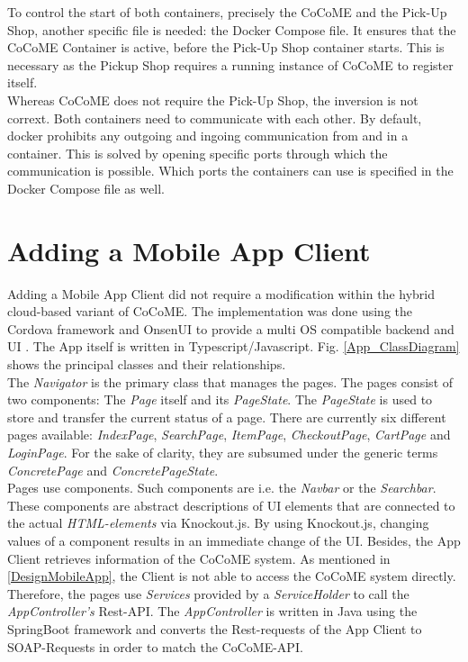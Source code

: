  \noindent
 	To control the start of both containers, precisely the CoCoME and the Pick-Up Shop, another specific file is needed: the Docker Compose file. It ensures that the CoCoME Container is active, before the Pick-Up Shop container starts. This is necessary as the Pickup Shop requires a running instance of CoCoME to register itself.\\
 	Whereas CoCoME does not require the Pick-Up Shop, the inversion is not corrext.
 	Both containers need to communicate with each other. By default, docker prohibits any outgoing and ingoing communication from and in a container. This is solved by opening specific ports through which the communication is possible. Which ports the containers can use is specified in the Docker Compose file as well.
 	
 	
 \section{Adding a Mobile App Client}\label{AppImplementation}
Adding a Mobile App Client did not require a modification within the hybrid cloud-based variant of CoCoME. The implementation was done using the Cordova framework and OnsenUI to provide a multi OS compatible backend and UI \cite{schnabel}. The App itself is written in Typescript/Javascript. Fig. \ref{App_ClassDiagram} shows the principal classes and their relationships.
\\
The \textit{Navigator} is the primary class that manages the pages. The pages consist of two components: The \textit{Page} itself and its \textit{PageState}. The \textit{PageState} is used to store and transfer the current status of a page. There are currently six different pages available: \textit{IndexPage}, \textit{SearchPage}, \textit{ItemPage}, \textit{CheckoutPage}, \textit{CartPage} and \textit{LoginPage}. For the sake of clarity, they are subsumed under the generic terms \textit{ConcretePage} and \textit{ConcretePageState}. 
\\
Pages use components. Such components are i.e. the \textit{Navbar} or the \textit{Searchbar}. These components are abstract descriptions of UI elements that are connected to the actual \textit{HTML-elements} via Knockout.js. By using Knockout.js, changing values of a component results in an immediate change of the UI. 
Besides, the App Client retrieves information of the CoCoME system.  As mentioned in \ref{DesignMobileApp}, the Client is not able to access the CoCoME system directly. Therefore, the pages use \textit{Services} provided by a \textit{ServiceHolder} to call the \textit{AppController's} Rest-API. The \textit{AppController} is written in Java using the SpringBoot framework and converts the Rest-requests of the App Client to SOAP-Requests in order to match the CoCoME-API. 
  
